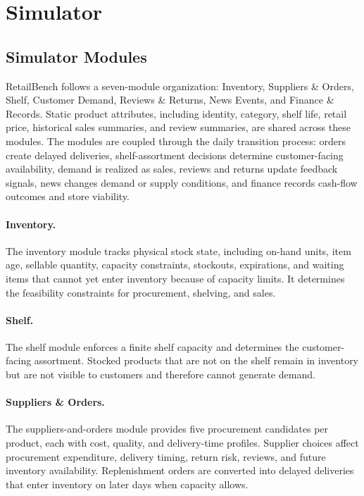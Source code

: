 \section{Simulator}
\label{appendix:simulator}

\subsection{Simulator Modules}
\label{app:simulator_modules}

RetailBench follows a seven-module organization: Inventory, Suppliers \& Orders, Shelf, Customer Demand, Reviews \& Returns, News Events, and Finance \& Records. Static product attributes, including identity, category, shelf life, retail price, historical sales summaries, and review summaries, are shared across these modules. The modules are coupled through the daily transition process: orders create delayed deliveries, shelf-assortment decisions determine customer-facing availability, demand is realized as sales, reviews and returns update feedback signals, news changes demand or supply conditions, and finance records cash-flow outcomes and store viability.

\paragraph{Inventory.}
The inventory module tracks physical stock state, including on-hand units, item age, sellable quantity, capacity constraints, stockouts, expirations, and waiting items that cannot yet enter inventory because of capacity limits. It determines the feasibility constraints for procurement, shelving, and sales.

\paragraph{Shelf.}
The shelf module enforces a finite shelf capacity and determines the customer-facing assortment. Stocked products that are not on the shelf remain in inventory but are not visible to customers and therefore cannot generate demand.

\paragraph{Suppliers \& Orders.}
The suppliers-and-orders module provides five procurement candidates per product, each with cost, quality, and delivery-time profiles. Supplier choices affect procurement expenditure, delivery timing, return risk, reviews, and future inventory availability. Replenishment orders are converted into delayed deliveries that enter inventory on later days when capacity allows.

